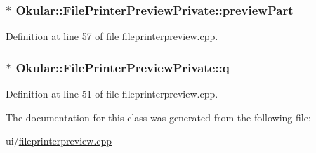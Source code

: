 \hypertarget{classOkular_1_1FilePrinterPreviewPrivate_aa4c0056a7613427e946e5eaede65d432}{
\subsubsection[{preview\+Part}]{$\ast$ Okular\+::\+File\+Printer\+Preview\+Private\+::preview\+Part}}\label{classOkular_1_1FilePrinterPreviewPrivate_aa4c0056a7613427e946e5eaede65d432}


Definition at line 57 of file fileprinterpreview.\+cpp.

\hypertarget{classOkular_1_1FilePrinterPreviewPrivate_a56292691ae86eccc0845583b01002728}{
\subsubsection[{q}]{$\ast$ Okular\+::\+File\+Printer\+Preview\+Private\+::q}}\label{classOkular_1_1FilePrinterPreviewPrivate_a56292691ae86eccc0845583b01002728}


Definition at line 51 of file fileprinterpreview.\+cpp.



The documentation for this class was generated from the following file\+:\begin{DoxyCompactItemize}
\item 
ui/\hyperlink{fileprinterpreview_8cpp}{fileprinterpreview.\+cpp}\end{DoxyCompactItemize}
